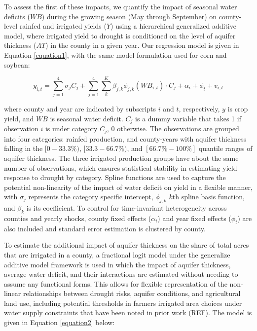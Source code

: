 \documentclass[
]{article}
\begin{document}
To assess the first of these impacts, we quantify the impact of seasonal water deficits (\(WB\)) during the growing season (May through September) on county-level rainfed and irrigated yields (\(Y\)) using a hierarchical generalized additive model, where irrigated yield to drought is conditioned on the level of aquifer thickness (\(AT\)) in the county in a given year. Our regression model is given in Equation \ref{equation1}, with the same model formulation used for corn and soybean:

\begin{equation}\label{equation1}
y_{i,t} = \sum_{j=1}^4 \sigma_j C_j + \sum_{j=1}^4 \sum_{k}^K \beta_{j,k}\phi_{j,k}(WB_{i,t})\cdot C_j  + \alpha_i + \phi_t + v_{i,t}
\end{equation}

where county and year are indicated by subscripts \(i\) and \(t\), respectively, \(y\) is crop yield, and \(WB\) is seasonal water deficit. \(C_j\) is a dummy variable that takes 1 if observation \(i\) is under category \(C_j\), 0 otherwise. The observations are grouped into four categories: rainfed production, and county-years with aquifer thickness falling in the \([0-33.3\%)\), \([33.3-66.7\%)\), and \([66.7\% - 100\%]\) quantile ranges of aquifer thickness. The three irrigated production groups have about the same number of observations, which ensures statistical stability in estimating yield response to drought by category. Spline functions are used to capture the potential non-linearity of the impact of water deficit on yield in a flexible manner, with \(\sigma_j\) represents the category specific intercept, \(\phi_{j,k}\) \(k\)th spline basis function, and \(\beta_k\) is its coefficient. To control for time-invariant heterogeneity across counties and yearly shocks, county fixed effects (\(\alpha_i\)) and year fixed effects (\(\phi_t\)) are also included and standard error estimation is clustered by county.

To estimate the additional impact of aquifer thickness on the share of total acres that are irrigated in a county, a fractional logit model under the generalize additive model framework is used in which the impact of aquifer thickness, average water deficit, and their interactions are estimated without needing to assume any functional forms. This allows for flexible representation of the non-linear relationships between drought risks, aquifer conditions, and agricultural land use, including potential thresholds in farmers irrigated area choices under water supply constraints that have been noted in prior work (REF). The model is given in Equation \ref{equation2} below:
\end{document}
